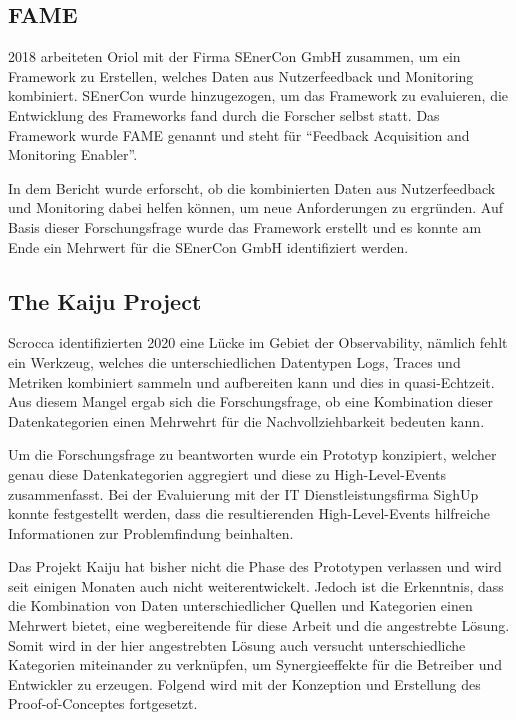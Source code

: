 \subsection{FAME}
\label{sec:fame}

2018 arbeiteten Oriol \etal \cite{FamePaper} mit der Firma SEnerCon GmbH zusammen, um ein Framework zu Erstellen, welches Daten aus Nutzerfeedback und Monitoring kombiniert. SEnerCon wurde hinzugezogen, um das Framework zu evaluieren, die Entwicklung des Frameworks fand durch die Forscher selbst statt. Das Framework wurde FAME\footnotemark{} genannt und steht für \enquote{Feedback Acquisition and Monitoring Enabler}.


In dem Bericht wurde erforscht, ob die kombinierten Daten aus Nutzerfeedback und Monitoring dabei helfen können, um neue Anforderungen zu ergründen. Auf Basis dieser Forschungsfrage wurde das Framework erstellt und es konnte am Ende ein Mehrwert für die SEnerCon GmbH identifiziert werden.

\subsection{The Kaiju Project}
\label{sec:kaiju}

Scrocca \etal \cite{TheKaijuProjectPaper} identifizierten 2020 eine Lücke im Gebiet der Observability, nämlich fehlt ein Werkzeug, welches die unterschiedlichen Datentypen Logs, Traces und Metriken kombiniert sammeln und aufbereiten kann und dies in quasi-Echtzeit. Aus diesem Mangel ergab sich die Forschungsfrage, ob eine Kombination dieser Datenkategorien einen Mehrwehrt für die Nachvollziehbarkeit bedeuten kann.

Um die Forschungsfrage zu beantworten wurde ein Prototyp konzipiert, welcher genau diese Datenkategorien aggregiert und diese zu High-Level-Events zusammenfasst. Bei der Evaluierung mit der IT Dienstleistungsfirma SighUp konnte festgestellt werden, dass die resultierenden High-Level-Events hilfreiche Informationen zur Problemfindung beinhalten.

Das Projekt Kaiju hat bisher nicht die Phase des Prototypen verlassen und wird seit einigen Monaten auch nicht weiterentwickelt\footnotemark{}. Jedoch ist die Erkenntnis, dass die Kombination von Daten unterschiedlicher Quellen und Kategorien einen Mehrwert bietet, eine wegbereitende für diese Arbeit und die angestrebte Lösung. Somit wird in der hier angestrebten Lösung auch versucht unterschiedliche Kategorien miteinander zu verknüpfen, um Synergieeffekte für die Betreiber und Entwickler zu erzeugen. Folgend wird mit der Konzeption und Erstellung des Proof-of-Conceptes fortgesetzt.


